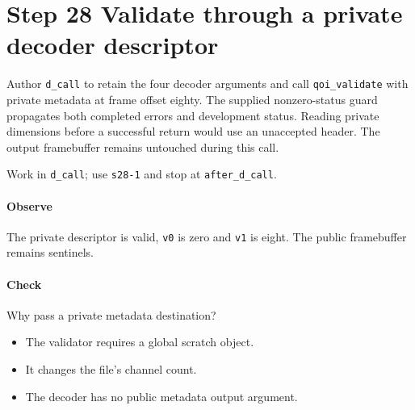 \section{Step 28 Validate through a private decoder descriptor}\label{qoi-s28}
Author \texttt{d\_call} to retain the four decoder arguments and call \texttt{qoi\_validate} with private metadata at frame offset eighty. The supplied nonzero-status guard propagates both completed errors and development status. Reading private dimensions before a successful return would use an unaccepted header. The output framebuffer remains untouched during this call.

Work in \texttt{d\_call}; use \texttt{s28-1} and stop at \texttt{after\_d\_call}.

\paragraph{Observe} The private descriptor is valid, \texttt{v0} is zero and \texttt{v1} is eight. The public framebuffer remains sentinels.

\paragraph{Check} Why pass a private metadata destination?
\begin{itemize}
\item[A.] The validator requires a global scratch object.
\item[B.] It changes the file’s channel count.
\item[C.] The decoder has no public metadata output argument.
\end{itemize}
